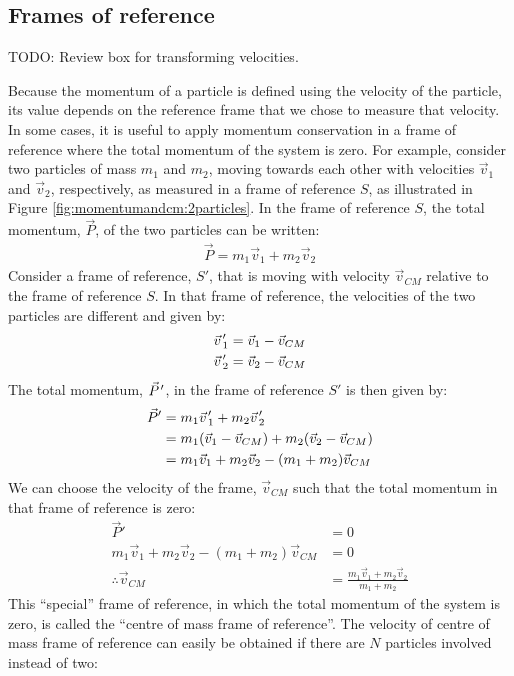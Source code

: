 \subsection{Frames of reference}
TODO: Review box for transforming velocities.

Because the momentum of a particle is defined using the velocity of the particle, its value depends on the reference frame that we chose to measure that velocity. In some cases, it is useful to apply momentum conservation in a frame of reference where the total momentum of the system is zero. For example, consider two particles of mass $m_1$ and $m_2$, moving towards each other with velocities $\vec v_1$ and $\vec v_2$, respectively, as measured in a frame of reference $S$, as illustrated in Figure \ref{fig:momentumandcm:2particles}.
In the frame of reference $S$, the total momentum, $\vec P$, of the two particles can be written:
\begin{align*}
\vec P = m_1\vec v_1 + m_2\vec v_2
\end{align*}
Consider a frame of reference, $S'$, that is moving with velocity $\vec v_{CM}$ relative to the frame of reference $S$. In that frame of reference, the velocities of the two particles are different and given by:
\begin{align*}
\pvec v'_1&=\vec v_1- \vec v_{CM}\\
\pvec v'_2&=\vec v_2- \vec v_{CM}\\
\end{align*}
The total momentum, $\pvec P'$, in the frame of reference $S'$ is then given by:
\begin{align*}
\vec P' &= m_1\pvec v'_1 + m_2 \pvec v'_2\\
&=m_1(\vec v_1- \vec v_{CM})+m_2(\vec v_2- \vec v_{CM})\\
&= m_1\vec v_1 + m_2\vec v_2 - (m_1+m_2) \vec v_{CM}
\end{align*}
We can choose the velocity of the frame, $\vec v_{CM}$ such that the total momentum in that frame of reference is zero:
\begin{align*}
\vec P' &= 0\\
m_1\vec v_1 + m_2\vec v_2 - (m_1+m_2) \vec v_{CM} &=0\\
\therefore \vec v_{CM} &= \frac{m_1\vec v_1 + m_2\vec v_2 }{m_1+m_2}
\end{align*}
This ``special'' frame of reference, in which the total momentum of the system is zero, is called the ``centre of mass frame of reference''. The velocity of centre of mass frame of reference can easily be obtained if there are $N$ particles involved instead of two:
